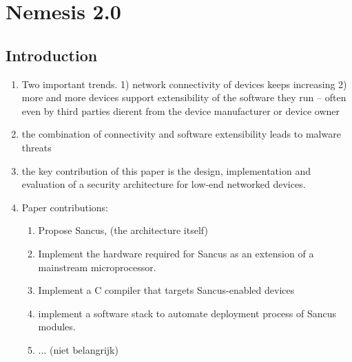 \documentclass{article}
\begin{document}
\section{Nemesis 2.0}
\subsection{Introduction}
\begin{enumerate}
\item Two important trends. 1) network connectivity of devices keeps increasing 2) more and
more devices support extensibility of the software they run – often even by third parties dierent from the device manufacturer or device owner
\item the combination of connectivity and software extensibility leads to malware threats
\item the key contribution of this paper is the design, implementation and evaluation of a security architecture for low-end networked devices. 
\item Paper contributions: 
\begin{enumerate}
\item Propose Sancus, (the architecture itself) 
\item Implement the hardware required for Sancus as an extension of a mainstream microprocessor. 
\item Implement a C compiler that targets Sancus-enabled devices
\item implement a software stack to automate deployment process of Sancus modules. 
\item ... (niet belangrijk)
\end{enumerate}


\end{enumerate}
\end{document}
